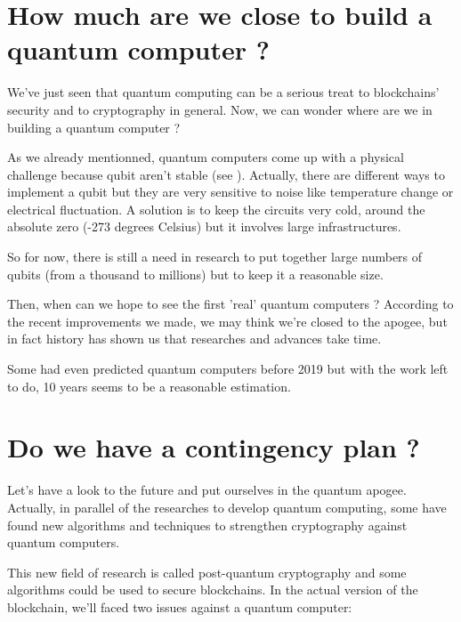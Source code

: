 \section{How much are we close to build a quantum computer ?}

We've just seen that quantum computing can be a serious treat to blockchains' security and to cryptography in general. Now, we can wonder where are we in building a quantum computer ? \newline

As we already mentionned, quantum computers come up with a physical challenge because qubit aren't stable (see \cite{closeToQuantum}). Actually, there are different ways to implement a qubit but they are very sensitive to noise like temperature change or electrical fluctuation. A solution is to keep the circuits very cold, around the absolute zero (-273 degrees Celsius) but it involves large infrastructures.

So for now, there is still a need in research to put together large numbers of qubits (from a thousand to millions) but to keep it a reasonable size. \newline

Then, when can we hope to see the first 'real' quantum computers ? According to the recent improvements we made, we may think we're closed to the apogee, but in fact history has shown us that researches and advances take time. \newline

Some had even predicted quantum computers before 2019 but with the work left to do, 10 years seems to be a reasonable estimation.

\section{Do we have a contingency plan ?}

Let's have a look to the future and put ourselves in the quantum apogee. Actually, in parallel of the researches to develop quantum computing, some have found new algorithms and techniques to strengthen cryptography against quantum computers.

This new field of research is called post-quantum cryptography and some algorithms could be used to secure blockchains. In the actual version of the blockchain, we'll faced two issues against a quantum computer: \newline

